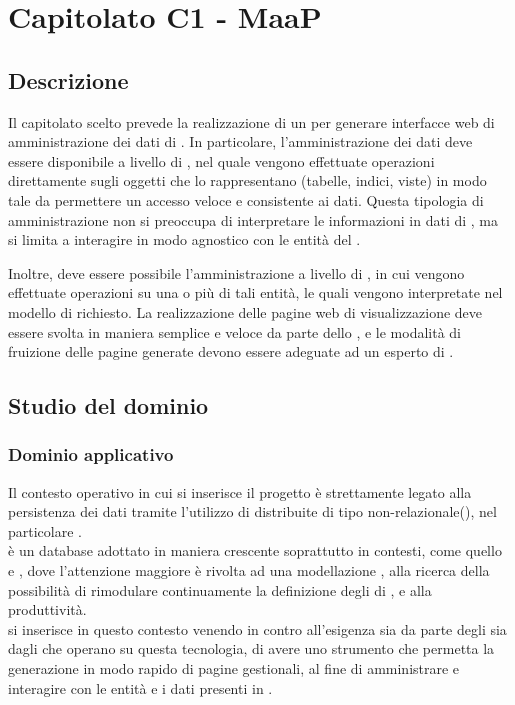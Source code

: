 \section{Capitolato C1 - MaaP}

\subsection{Descrizione}
Il capitolato scelto prevede la realizzazione di un  per generare interfacce web di amministrazione dei dati di . In particolare, l'amministrazione dei dati deve essere disponibile a livello di , nel quale vengono effettuate operazioni direttamente sugli oggetti che lo rappresentano (tabelle, indici, viste) in modo tale da permettere un accesso veloce e consistente ai dati. Questa tipologia di amministrazione non si preoccupa di interpretare le informazioni in dati di , ma si limita a interagire in modo agnostico con le entità del .

Inoltre, deve essere possibile l'amministrazione a livello di , in cui vengono effettuate operazioni su una o più di tali entità, le quali vengono interpretate nel modello di  richiesto. La realizzazione delle pagine web di visualizzazione deve essere svolta in maniera semplice e veloce da parte dello , e le modalità di fruizione delle pagine generate devono essere adeguate ad un esperto di .

\subsection{Studio del dominio}

        \subsubsection{Dominio applicativo}
        Il contesto operativo in cui si inserisce il progetto è strettamente legato alla persistenza dei dati tramite l'utilizzo di  distribuite di tipo non-relazionale(), nel particolare .\\
          è un database   adottato in maniera crescente soprattutto in contesti, come quello   e  , dove l'attenzione maggiore è rivolta ad una modellazione  , alla ricerca della possibilità di rimodulare continuamente la definizione degli   di  , e alla produttività.\\
        \ProjectName{} si inserisce in questo contesto venendo in contro all'esigenza sia da parte degli   sia dagli   che operano su questa tecnologia, di avere uno strumento che permetta la generazione in modo rapido di pagine gestionali, al fine di amministrare e interagire con le entità e i dati presenti in  .
        

